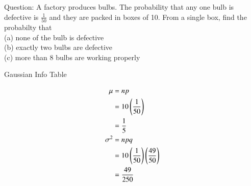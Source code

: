 \documentclass[journal,12pt,onecolumn]{IEEEtran}
\theoremstyle{remark}
\begin{document}
%
Question: A factory produces bulbs. The probability that any one bulb is defective is $\frac{1}{50}$ and they are packed in boxes of 10. From a single box, find the probabilty that\\
(a) none of the bulb is defective\\
(b) exactly two bulbs are defective\\
(c) more than 8 bulbs are working properly
\\ \solution
\begin{table}[!htb]
	
	\caption{Gaussian Info Table}
	\label{table:gaussian/9/3/25/}	
\end{table}
%
\begin{align}
	\mu &=np\\
	    &= 10\left(\frac{1}{50}\right)\\
	    &= \frac{1}{5}\\
	{\sigma}^2 &= npq\\
	&= 10\left(\frac{1}{50}\right)\left(\frac{49}{50}\right)\\
	&= \frac{49}{250}	
\end{align}
%
\end{document}
